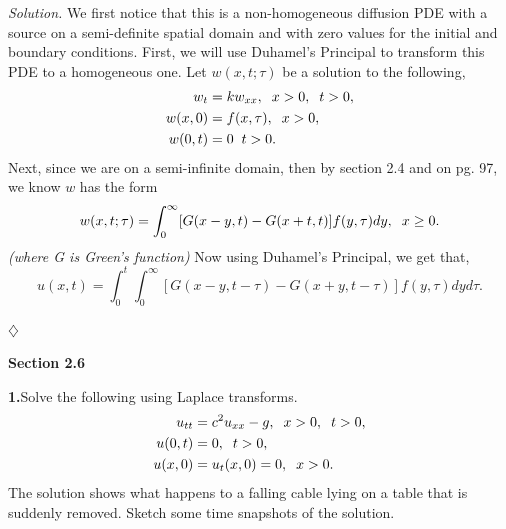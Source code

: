 \documentclass{article}
\begin{document}
\vspace{3mm}
\textit{Solution.} We first notice that this is a non-homogeneous diffusion PDE with a source on a semi-definite spatial domain and with zero values for the initial and boundary conditions. First, we will use Duhamel's Principal to transform this PDE to a homogeneous one. Let \(w(x,t;\tau)\) be a solution to the following,
\begin{align*}
w_t &= kw_{xx}, \hspace{2mm} x>0, \hspace{2mm} t>0, \\
w(x,0) &= f(x,\tau), \hspace{2mm} x>0, \\
w(0,t) &= 0 \hspace{2mm} t>0.
\end{align*}
Next, since we are on a semi-infinite domain, then by section 2.4 and on pg. 97, we know \(w\) has the form
\[
w(x,t;\tau)= \int_0^{\infty} [G(x-y,t) - G(x+t,t)] f(y,\tau) dy , \hspace{2mm} x \geq 0. 
\]
\textit{(where G is Green's function) }
Now using Duhamel's Principal, we get that, 
\[
u(x,t) = \int_0^t \int_0^{\infty} [G(x-y,t-\tau) - G(x+y,t-\tau)] f(y,\tau) dy d\tau.
\]
\begin{flushright}
\( \diamondsuit \)
\end{flushright}



\newpage
\textbf{Section 2.6}

\textbf{1.}Solve the following using Laplace transforms. 
\begin{align*}
u_{tt} &= c^2u_{xx} - g,  \hspace{2mm} x>0, \hspace{2mm} t>0, \\
u(0,t) &=0, \hspace{2mm} t>0, \\
u(x,0) &= u_t(x,0) = 0, \hspace{2mm} x>0. 
\end{align*}
The solution shows what happens to a falling cable lying on a table that is suddenly removed. Sketch some time snapshots of the solution. 
\end{document}
